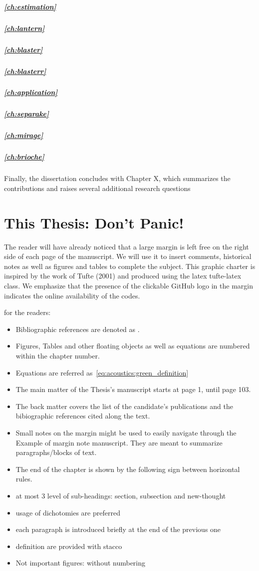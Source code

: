 \subparagraph{\cref{ch:estimation}}
\subparagraph{\cref{ch:lantern}}
\subparagraph{\cref{ch:blaster}}
\subparagraph{\cref{ch:blasterr}}


\subparagraph{\cref{ch:application}}
\subparagraph{\cref{ch:separake}}
\subparagraph{\cref{ch:mirage}}
\subparagraph{\cref{ch:brioche}}


Finally, the dissertation concludes with Chapter X, which summarizes
the contributions and raises several additional research questions


\section{This Thesis: Don't Panic!}
The reader will have already noticed that a large margin is left free on the right side of each page of the manuscript.
We will use it to insert comments, historical notes as well as figures and tables to complete the subject.
This graphic charter is inspired by the work of Tufte (2001) and produced using the latex tufte-latex class.
We emphasize that the presence of the clickable GitHub logo in the margin indicates the online availability of the codes.

 for the readers:
\begin{itemize}
    \item Bibliographic references are denoted as \cite{kuttruff2016room}.
    \item Figures, Tables and other floating objects as well as equations are numbered within the chapter number.
    \item Equations are referred as~\cref{eq:acoustics:green_definition}
    \item The main matter of the Thesis’s manuscript starts at page 1, until page 103.
    \item The back matter covers the list of the candidate’s publications and the bibiographic references cited along the text.
    \item Small notes on the margin might be used to easily navigate through the Example of margin note manuscript. They are meant to summarize paragraphs/blocks of text.
    \item The end of the chapter is shown by the following sign between horizontal rules.
\end{itemize}

\begin{itemize}
    \item at most 3 level of sub-headings: section, subsection and new-thought
    \item usage of dichotomies are preferred
    \item each paragraph is introduced briefly at the end of the previous one
    \item definition are provided with stacco
    \item Not important figures: without numbering
\end{itemize}